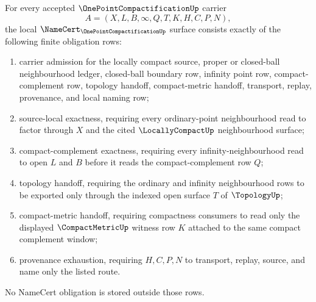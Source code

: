 \begin{theorem}
\label{thm:one-point-compactification-namecert-obligations}
For every accepted $\OnePointCompactificationUp$ carrier
$$
A=(X,L,B,\infty,Q,T,K,H,C,P,N),
$$
the local $\NameCert_{\OnePointCompactificationUp}$ surface consists exactly of the following finite obligation rows:
\begin{enumerate}
\item carrier admission for the locally compact source, proper or closed-ball neighbourhood ledger, closed-ball boundary row, infinity point row, compact-complement row, topology handoff, compact-metric handoff, transport, replay, provenance, and local naming row;
\item source-local exactness, requiring every ordinary-point neighbourhood read to factor through $X$ and the cited $\LocallyCompactUp$ neighbourhood surface;
\item compact-complement exactness, requiring every infinity-neighbourhood read to open $L$ and $B$ before it reads the compact-complement row $Q$;
\item topology handoff, requiring the ordinary and infinity neighbourhood rows to be exported only through the indexed open surface $T$ of $\TopologyUp$;
\item compact-metric handoff, requiring compactness consumers to read only the displayed $\CompactMetricUp$ witness row $K$ attached to the same compact complement window;
\item provenance exhaustion, requiring $H,C,P,N$ to transport, replay, source, and name only the listed route.
\end{enumerate}
No NameCert obligation is stored outside those rows.
\end{theorem}
